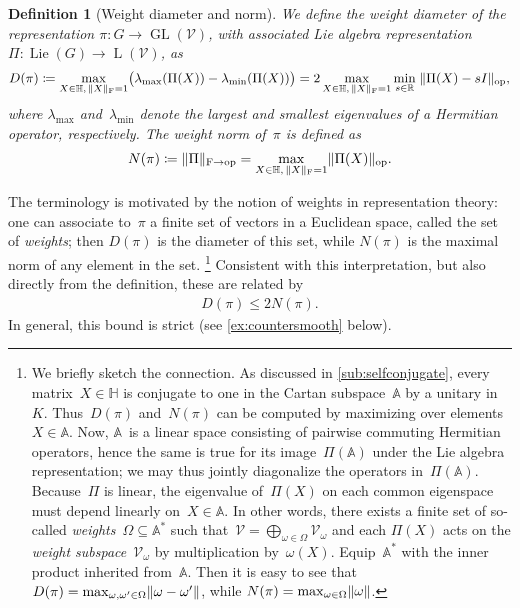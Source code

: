 \documentclass[11pt,letterpaper]{article}
\newtheorem{definition}[theorem]{Definition}\AddToHook{env/definition/begin}{\crefalias{theorem}{definition}}
\numberwithin{equation}{section}
\renewcommand{\AA}{\mathbb{A}}
\newcommand{\RR}{\mathbb{R}}
\newcommand{\bbH}{\mathbb{H}}
\newcommand{\VV}{\mathcal{V}}
\DeclareMathOperator{\GL}{GL}
\DeclareMathOperator{\Lin}{L}
\DeclareMathOperator{\ope}{op}
\DeclareMathOperator{\Lie}{Lie}
\DeclarePairedDelimiter\norm{\lVert}{\rVert}
\begin{document}
\begin{definition}[Weight diameter and norm]\label{def:weight diameter}
We define the \emph{weight diameter} of the representation $\pi \colon G \to \GL(\VV)$, with associated Lie algebra representation~$\Pi \colon \Lie(G) \to \Lin(\VV)$, as
\begin{align*}
    D(\pi)
\coloneqq \max_{X \in \bbH, \, \norm X_{\mathrm F} = 1} \bigl( \lambda_{\max}(\Pi(X)) - \lambda_{\min}(\Pi(X)) \bigr)
= 2 \max_{X \in \bbH, \, \norm X_{\mathrm F} = 1} \min_{s \in \RR} \; \norm{\Pi(X) - s I}_{\ope},
\end{align*}
where $\lambda_{\max}$ and~$\lambda_{\min}$ denote the largest and smallest eigenvalues of a Hermitian operator, respectively.
The \emph{weight norm} of~$\pi$ is defined as
\begin{align*}
    N(\pi)
\coloneqq \norm{\Pi}_{\mathrm{F} \to \ope}
= \max_{X \in \bbH, \, \norm X_{\mathrm F} = 1} \norm{\Pi(X)}_{\ope}.
\end{align*}
\end{definition}

\noindent
The terminology is motivated by the notion of weights in representation theory:
one can associate to~$\pi$ a finite set of vectors in a Euclidean space, called the set of \emph{weights};
then $D(\pi)$ is the diameter of this set, while $N(\pi)$ is the maximal norm of any element in the set.%
\footnote{\label{foot:weights}We briefly sketch the connection.
As discussed in \cref{sub:selfconjugate}, every matrix~$X \in \bbH$ is conjugate to one in the Cartan subspace~$\AA$ by a unitary in~$K$.
Thus~$D(\pi)$ and~$N(\pi)$ can be computed by maximizing over elements~$X \in \AA$.
Now, $\AA$~is a linear space consisting of pairwise commuting Hermitian operators, hence the same is true for its image~$\Pi(\AA)$ under the Lie algebra representation; we may thus jointly diagonalize the operators in~$\Pi(\AA)$.
Because~$\Pi$ is linear, the eigenvalue of~$\Pi(X)$ on each common eigenspace must depend linearly on~$X\in\AA$.
In other words, there exists a finite set of so-called \emph{weights}~$\Omega \subseteq \AA^*$ such that~$\VV = \bigoplus_{\omega\in\Omega} \VV_\omega$ and each $\Pi(X)$ acts on the \emph{weight subspace}~$\VV_\omega$ by multiplication by~$\omega(X)$.
Equip~$\AA^*$ with the inner product inherited from~$\AA$.
Then it is easy to see that~$D(\pi) = \max_{\omega,\omega'\in\Omega} \norm{\omega-\omega'}$, while $N(\pi) = \max_{\omega\in\Omega} \norm\omega$.}
Consistent with this interpretation, but also directly from the definition, these are related by
\begin{align}\label{eq:weight diam vs norm}
    D(\pi) \leq 2 N(\pi).
\end{align}
In general, this bound is strict (see \cref{ex:countersmooth} below).
\end{document}
